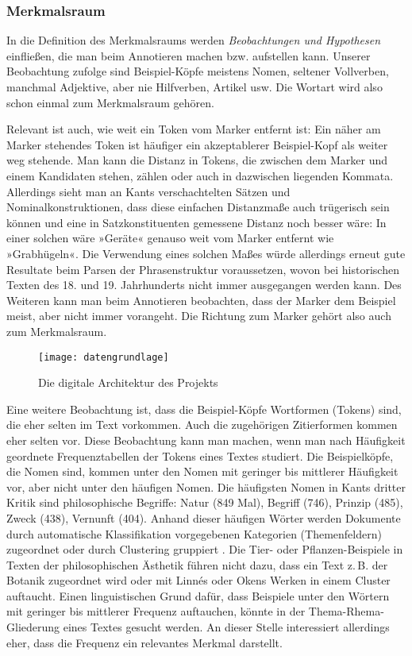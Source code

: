 \documentclass{article}
\begin{document}
\subsubsection{Merkmalsraum}

In die Definition des Merkmalsraums werden \emph{Beobachtungen und
  Hypothesen} einfließen, die man beim Annotieren machen
bzw. aufstellen kann. Unserer Beobachtung zufolge sind Beispiel-Köpfe
meistens Nomen, seltener Vollverben, manchmal Adjektive, aber nie
Hilfverben, Artikel usw. Die Wortart wird also schon einmal zum
Merkmalsraum gehören.

Relevant ist auch, wie weit ein Token vom Marker entfernt ist: Ein
näher am Marker stehendes Token ist häufiger ein akzeptablerer
Beispiel-Kopf als weiter weg stehende. Man kann die Distanz in Tokens,
die zwischen dem Marker und einem Kandidaten stehen, zählen oder auch
in dazwischen liegenden Kommata. Allerdings sieht man an Kants
verschachtelten Sätzen und Nominalkonstruktionen, dass diese einfachen
Distanzmaße auch trügerisch sein können und eine in Satzkonstituenten
gemessene Distanz noch besser wäre: In einer solchen wäre »Geräte«
genauso weit vom Marker entfernt wie »Grabhügeln«. Die Verwendung
eines solchen Maßes würde allerdings erneut gute Resultate beim Parsen
der Phrasenstruktur voraussetzen, wovon bei historischen Texten des
18. und 19. Jahrhunderts nicht immer ausgegangen werden kann. Des
Weiteren kann man beim Annotieren beobachten, dass der Marker dem
Beispiel meist, aber nicht immer vorangeht. Die Richtung zum Marker
gehört also auch zum Merkmalsraum.

\begin{figure}[t]
  \ttfamily
  \texttt{[image: datengrundlage]}
  \caption{Die digitale Architektur des Projekts}
  \label{fig:Architektur}
\end{figure}

\afterpage{\clearpage}

Eine weitere Beobachtung ist, dass die Beispiel-Köpfe Wortformen
(Tokens) sind, die eher selten im Text vorkommen. Auch die zugehörigen
Zitierformen kommen eher selten vor. Diese Beobachtung kann man
machen, wenn man nach Häufigkeit geordnete Frequenztabellen der Tokens
eines Textes studiert. Die Beispielköpfe, die Nomen sind, kommen unter
den Nomen mit geringer bis mittlerer Häufigkeit vor, aber nicht unter
den häufigen Nomen. Die häufigsten Nomen in Kants dritter Kritik sind
philosophische Begriffe: Natur (849 Mal), Begriff (746), Prinzip
(485), Zweck (438), Vernunft (404). Anhand dieser häufigen Wörter
werden Dokumente durch automatische Klassifikation vorgegebenen
Kategorien (Themenfeldern) zugeordnet \parencite{Sebastiani2002a} oder
durch Clustering gruppiert \parencite[195--209]{Heyer2006a}. Die Tier-
oder Pflanzen-Beispiele in Texten der philosophischen Ästhetik führen
nicht dazu, dass ein Text z.\,B. der Botanik zugeordnet wird oder mit
Linnés oder Okens Werken in einem Cluster auftaucht. Einen
linguistischen Grund dafür, dass Beispiele unter den Wörtern mit
geringer bis mittlerer Frequenz auftauchen, könnte in der
Thema-Rhema-Gliederung eines Textes gesucht
werden. \Parencite[784-786]{Bussm1990} An dieser Stelle interessiert
allerdings eher, dass die Frequenz ein relevantes Merkmal darstellt.
\end{document}
